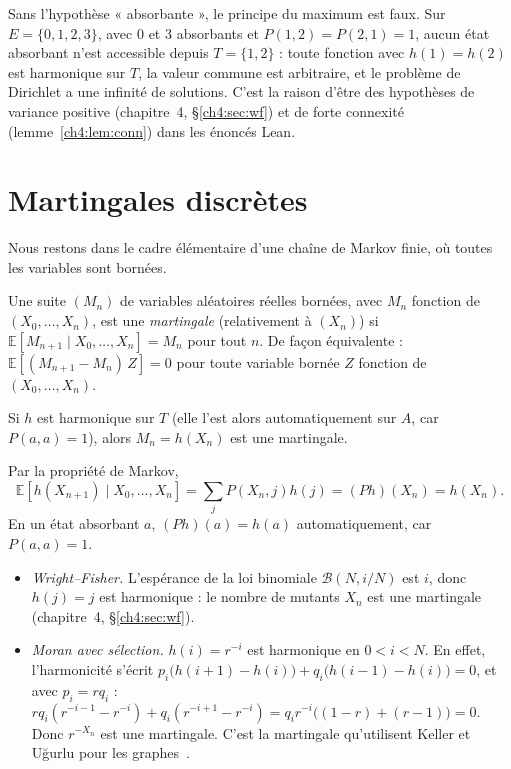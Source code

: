 \begin{remark}
Sans l'hypothèse « absorbante », le principe du maximum est faux. Sur $E=\{0,1,2,3\}$, avec $0$ et $3$
absorbants et $P(1,2)=P(2,1)=1$, aucun état absorbant n'est accessible depuis $T=\{1,2\}$ : toute fonction avec
$h(1)=h(2)$ est harmonique sur $T$, la valeur commune est arbitraire, et le problème de Dirichlet a une infinité de
solutions. C'est la raison d'être des hypothèses de variance positive (chapitre~4, §\ref{ch4:sec:wf}) et de forte
connexité (lemme~\ref{ch4:lem:conn}) dans les énoncés Lean.
\end{remark}

\section{Martingales discrètes}\label{appB:sec:mart}

Nous restons dans le cadre élémentaire d'une chaîne de Markov finie, où toutes les variables sont bornées.

\begin{definition}
Une suite $(M_n)$ de variables aléatoires réelles bornées, avec $M_n$ fonction de $(X_0,\dots,X_n)$, est une
\emph{martingale} (relativement à $(X_n)$) si $\mathbb E[M_{n+1}\mid X_0,\dots,X_n]=M_n$ pour tout $n$. De façon
équivalente : $\mathbb E[(M_{n+1}-M_n)\,Z]=0$ pour toute variable bornée $Z$ fonction de $(X_0,\dots,X_n)$.
\end{definition}

\begin{proposition}\label{appB:prop:harmmart}
Si $h$ est harmonique sur $T$ (elle l'est alors automatiquement sur $A$, car $P(a,a)=1$), alors
$M_n=h(X_n)$ est une martingale.
\end{proposition}

\begin{humanproof}
Par la propriété de Markov,
\[\mathbb E[h(X_{n+1})\mid X_0,\dots,X_n]=\sum_jP(X_n,j)h(j)=(Ph)(X_n)=h(X_n) .\]
En un état
absorbant $a$, $(Ph)(a)=h(a)$ automatiquement, car $P(a,a)=1$.
\end{humanproof}

\begin{example}
\begin{itemize}
\item \emph{Wright--Fisher.} L'espérance de la loi binomiale $\mathcal B(N,i/N)$ est $i$, donc $h(j)=j$ est harmonique :
le nombre de mutants $X_n$ est une martingale (chapitre~4, §\ref{ch4:sec:wf}).
\item \emph{Moran avec sélection.} $h(i)=r^{-i}$ est harmonique en $0<i<N$. En effet, l'harmonicité s'écrit
$p_i\bigl(h(i+1)-h(i)\bigr)+q_i\bigl(h(i-1)-h(i)\bigr)=0$, et avec $p_i=rq_i$ :
$rq_i(r^{-i-1}-r^{-i})+q_i(r^{-i+1}-r^{-i})=q_ir^{-i}\bigl((1-r)+(r-1)\bigr)=0$. Donc
$r^{-X_n}$ est une martingale. C'est la martingale qu'utilisent Keller et Uğurlu pour les graphes~\cite{ch4:KU}.
\end{itemize}
\end{example}

